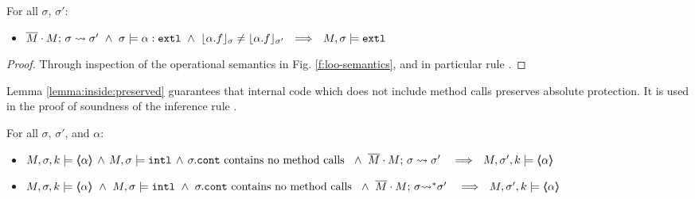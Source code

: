 { {
 \begin{lemma} For all $\sigma$, $\sigma'$:
 \label{change:external}
\begin{itemize}
\item
$\leadstoBounded  {\Mtwo\cdot M}  {\sigma}  {\sigma'}\ \wedge \  \sigma \models \external{\alpha} \ \wedge\  {\interpret{\sigma} {\alpha.f}} \neq {\interpret{\sigma'} {\alpha.f}}
 \ \ \Longrightarrow\ \  M,\sigma \models \extThis$
\end{itemize}
\end{lemma}
  } 
  \begin{proof}
  Through inspection of the operational semantics in Fig. \ref{f:loo-semantics}, and in particular rule {}.
  \end{proof}  
  
 

Lemma \ref{lemma:inside:preserved}  guarantees that internal code which does not include method calls preserves absolute protection. 
It is used in the proof of soundness of the inference rule {}.

  {
 \begin{lemma} For all $\sigma$, $\sigma'$, and $\alpha$:
 \label{lemma:inside:preserved} 
\begin{itemize}
\item
$ \satDAssertFrom M  {\sigma} k   {\inside{\alpha}}  \, \wedge \,M, \sigma \models \intThis \, \wedge \, \sigma.\prg{cont} \mbox{ contains no method calls } \ \wedge\ \leadstoBounded   {\Mtwo\cdot M}  {\sigma}  {\sigma'}\  \ \ \Longrightarrow\ \ \satDAssertFrom M  {\sigma'} k   {\inside{\alpha}}$
\item
$ \satDAssertFrom M  {\sigma} k   {\inside{\alpha}}  \ \wedge \ M, \sigma \models \intThis \ \wedge \ \sigma.\prg{cont}  \mbox{ contains no method calls } \ \wedge\ \leadstoBoundedStar  {\Mtwo\cdot M}  {\sigma}  {\sigma'}\  \ \ \Longrightarrow\ \ \satDAssertFrom M  {\sigma'} k   {\inside{\alpha}}$
\end{itemize}
\end{lemma}
}

}
